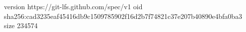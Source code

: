version https://git-lfs.github.com/spec/v1
oid sha256:cad3235eaf45416db9c1509785902f16d2b7f74821c37e207b40890e4bfa0ba3
size 234574
